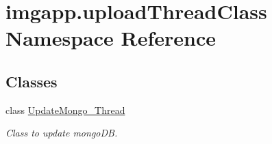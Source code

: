 \hypertarget{namespaceimgapp_1_1uploadThreadClass}{}\section{imgapp.\+upload\+Thread\+Class Namespace Reference}
\label{namespaceimgapp_1_1uploadThreadClass}
\subsection*{Classes}
\begin{DoxyCompactItemize}
\item 
class \hyperlink{classimgapp_1_1uploadThreadClass_1_1UpdateMongo__Thread}{Update\+Mongo\+\_\+\+Thread}
\begin{DoxyCompactList}\small\item\em Class to update mongo\+DB. \end{DoxyCompactList}\end{DoxyCompactItemize}
